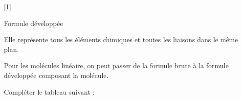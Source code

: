 [1]


\pasCorrection{\newpage \vspace*{-40pt}}

\vspace*{-8pt}
\begin{doc}{Formule développée}
  \begin{importants}  
    Elle représente tous les éléments chimiques et toutes les liaisons dans le même plan.
  \end{importants}

  \exemple*
  \vspace*{-18pt}
  \begin{center}
    \qq{}
    \qq{}
  \end{center}
\end{doc}

Pour les molécules linéaire, on peut passer de la formule brute à la formule développée  composant la molécule.

\numeroQuestion
Compléter le tableau suivant :

